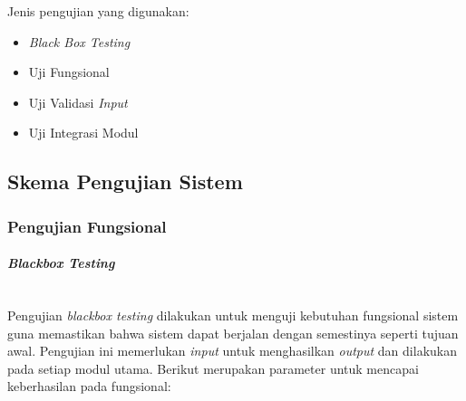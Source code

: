 Jenis pengujian yang digunakan:\par
\begin{itemize}[noitemsep]
	\item \textit{Black Box Testing}
	\item Uji Fungsional
	\item Uji Validasi \textit{Input}
	\item Uji Integrasi Modul
\end{itemize}

\subsection{Skema Pengujian Sistem} \label{III.SkemaPengujian}

\subsubsection{Pengujian Fungsional}
\paragraph{\textit{Blackbox Testing}}~\\
Pengujian \textit{blackbox testing} dilakukan untuk menguji kebutuhan fungsional sistem guna memastikan bahwa sistem dapat berjalan dengan semestinya seperti tujuan awal. Pengujian ini memerlukan \textit{input} untuk menghasilkan \textit{output} dan dilakukan pada setiap modul utama. Berikut merupakan parameter untuk mencapai keberhasilan pada fungsional:\par

